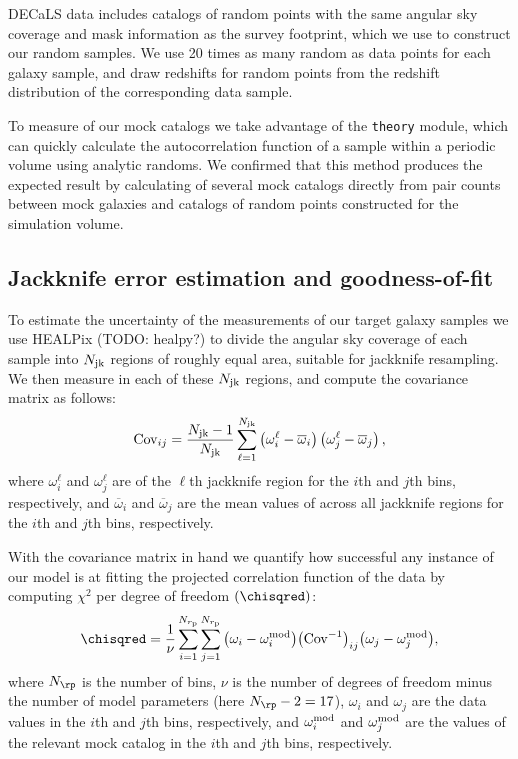 \documentclass[twocolumn,apj,iop,tighten]{emulateapj2}
\begin{document}
DECaLS data includes catalogs of random points with the same angular sky coverage and mask information as the survey footprint, which we use to construct our random samples. We use 20 times as many random as data points for each galaxy sample, and draw redshifts for random points from the redshift distribution of the corresponding data sample.

To measure \wprp of our mock catalogs we take advantage of the \corrfunc \texttt{theory} module, which can quickly calculate the autocorrelation function of a sample within a periodic volume using analytic randoms. We confirmed that this method produces the expected result by calculating \wprp of several mock catalogs directly from pair counts between mock galaxies and catalogs of random points constructed for the simulation volume.


\subsection{Jackknife error estimation and goodness-of-fit}\label{subsec:error}

To estimate the uncertainty of the \wprp measurements of our target galaxy samples we use HEALPix (TODO: healpy?) to divide the angular sky coverage of each sample into $N_{\rm jk}$ regions of roughly equal area, suitable for jackknife resampling. We then measure \wprp in each of these $N_{\rm jk}$ regions, and compute the covariance matrix as follows:
%
\begin{equation}\label{eq:cov}
{\rm Cov}_{ij} = \frac{N_{\rm jk}-1}{N_{\rm jk}}
\sum^{N_{\rm jk}}_{\ell=1}\left(\omega^\ell_i-\overline{\omega}_i\right) \left(\omega^\ell_j-\overline{\omega}_j\right),
\end{equation}
%
\noindent where $\omega^\ell_i$ and $\omega^\ell_j$ are \wprp of the $\ell$th jackknife region for the $i$th and $j$th \rp bins, respectively, and $\overline{\omega}_i$ and $\overline{\omega}_j$ are the mean values of \wprp across all jackknife regions for the $i$th and $j$th \rp bins, respectively.

With the covariance matrix in hand we quantify how successful any instance of our model is at fitting the projected correlation function of the data by computing $\chi^2$ per degree of freedom $(\chisqred)$:
%
\begin{equation}\label{eq:chisq}
\chisqred=\frac{1}{\nu}\sum_{i=1}^{N_{r_{\rm p}}}
\sum_{j=1}^{N_{r_{\rm p}}}\left(\omega_i-\omega^{\rm mod}_i\right)
\!\left({\rm Cov}^{-1}\right)_{ij}\!\left(\omega_j-\omega^{\rm mod}_j\right)\!,
\end{equation}
%
\noindent where $N_{\rp}$ is the number of \rp bins, $\nu$ is the number of degrees of freedom minus the number of model parameters (here ${N_{\rp}-2=17}$), $\omega_i$ and $\omega_j$ are the data \wprp values in the $i$th and $j$th \rp bins, respectively, and $\omega^{\rm mod}_i$ and $\omega^{\rm mod}_j$ are the \wprp values of the relevant mock catalog in the $i$th and $j$th \rp bins, respectively.
\end{document}
